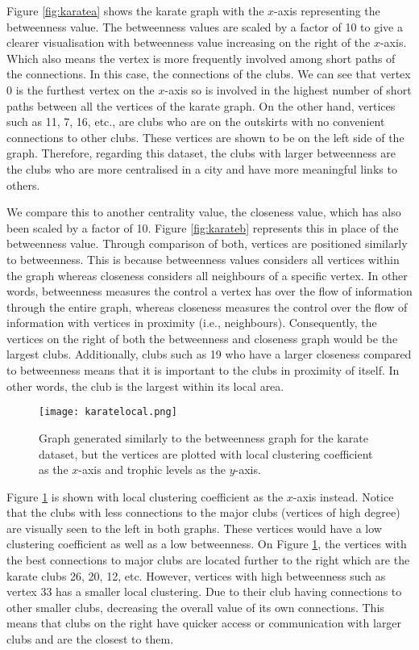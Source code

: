 Figure \ref{fig:karatea} shows the karate graph with the $x$-axis representing the betweenness value. The betweenness values are scaled by a factor of 10 to give a clearer visualisation with betweenness value increasing on the right of the $x$-axis. Which also means the vertex is more frequently involved among short paths of the connections. In this case, the connections of the clubs. We can see that vertex 0 is the furthest vertex on the $x$-axis so is involved in the highest number of short paths between all the vertices of the karate graph. On the other hand, vertices such as 11, 7, 16, etc., are clubs who are on the outskirts with no convenient connections to other clubs. These vertices are shown to be on the left side of the graph. Therefore, regarding this dataset, the clubs with larger betweenness are the clubs who are more centralised in a city and have more meaningful links to others.

We compare this to another centrality value, the closeness value, which has also been scaled by a factor of 10. Figure \ref{fig:karateb} represents this in place of the betweenness value. Through comparison of both, vertices are positioned similarly to betweenness. This is because betweenness values considers all vertices within the graph whereas closeness considers all neighbours of a specific vertex. In other words, betweenness measures the control a vertex has over the flow of information through the entire graph, whereas closeness measures the control over the flow of information with vertices in proximity (i.e., neighbours). Consequently, the vertices on the right of both the betweenness and closeness graph would be the largest clubs. Additionally, clubs such as 19 who have a larger closeness compared to betweenness means that it is important to the clubs in proximity of itself. In other words, the club is the largest within its local area.

\begin{figure}[!htb]
	\centering
	\texttt{[image: karatelocal.png]}
	\caption{Graph generated similarly to the betweenness graph for the karate dataset, but the vertices are plotted with local clustering coefficient as the $x$-axis and trophic levels as the $y$-axis.}
	\label{fig:karatelocal}
\end{figure}

Figure \ref{fig:karatelocal} is shown with local clustering coefficient as the $x$-axis instead. Notice that the clubs with less connections to the major clubs (vertices of high degree) are visually seen to the left in both graphs. These vertices would have a low clustering coefficient as well as a low betweenness. On Figure \ref{fig:karatelocal}, the vertices with the best connections to major clubs are located further to the right which are the karate clubs 26, 20, 12, etc. However, vertices with high betweenness such as vertex 33 has a smaller local clustering. Due to their club having connections to other smaller clubs, decreasing the overall value of its own connections. This means that clubs on the right have quicker access or communication with larger clubs and are the closest to them.

